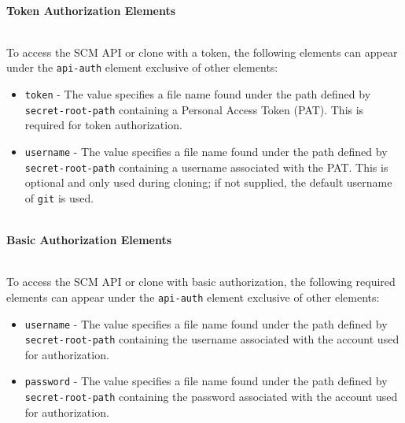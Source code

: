 \noindent\\\textbf{Token Authorization Elements}

\noindent\\To access the SCM API or clone with a token, the following elements can appear under the 
\texttt{api-auth} element exclusive of other elements:

\begin{itemize}
    \item \texttt{token} - The value specifies a file name found under the path defined
    by \texttt{secret-root-path} containing a Personal Access Token (PAT).  This is required for
    token authorization.
    \item \texttt{username} - The value specifies a file name found under the path defined
    by \texttt{secret-root-path} containing a username associated with the PAT.  This is 
    optional and only used during cloning; if not supplied, the default username of \texttt{git} is used.
\end{itemize}

\noindent\\\textbf{Basic Authorization Elements}

\noindent\\To access the SCM API or clone with basic authorization, the following required elements can
appear under the \texttt{api-auth} element exclusive of other elements:

\begin{itemize}
    \item \texttt{username} - The value specifies a file name found under the path defined
    by \texttt{secret-root-path} containing the username associated with the account used
    for authorization. 
    \item \texttt{password} - The value specifies a file name found under the path defined
    by \texttt{secret-root-path} containing the password associated with the account used
    for authorization. 
\end{itemize}




